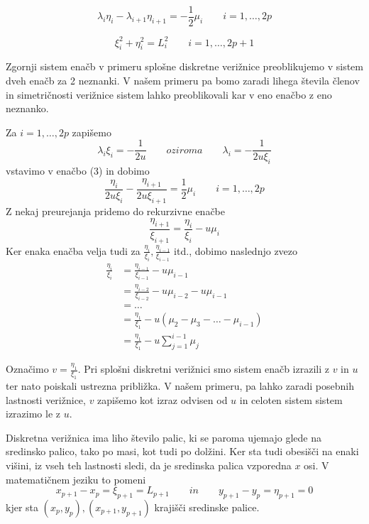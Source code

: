 \documentclass[A4paper, 11pt]{article}
\begin{document}
\begin{equation}
\lambda_i \eta_i - \lambda_{i+1} \eta_{i+1} = - \frac{1}{2} \mu_i \qquad i=1, \ldots, 2p 
\end{equation}

\begin{equation}
\xi_i ^2 + \eta_i ^2 = L_i ^2 \qquad i=1, \ldots, 2p+1 
\end{equation}

Zgornji sistem enačb v primeru splošne diskretne verižnice preoblikujemo v sistem dveh enačb za 2 neznanki. V našem primeru pa bomo zaradi lihega števila členov in simetričnosti verižnice sistem lahko preoblikovali kar v eno enačbo z eno neznanko. 

Za $i=1, \ldots, 2p$ zapišemo
\[ \lambda_i \xi_i = - \frac{1}{2u} \qquad oziroma \qquad \lambda_i = - \frac{1}{2u \xi_i}  \]
vstavimo v enačbo (3) in dobimo
\[ \frac{\eta_i}{2u \xi_i} - \frac{\eta_{i+1}}{2u \xi_{i+1}} = \frac{1}{2} \mu_i \qquad i=1, \ldots, 2p \]
Z nekaj preurejanja pridemo do rekurzivne enačbe
\[ \frac{\eta_{i+1}}{\xi_{i+1}} =  \frac{\eta_i}{\xi_i} - u \mu_i \]
Ker enaka enačba velja tudi za $\frac{\eta_i}{\xi_i}, \frac{\eta_{i-1}}{\xi_{i-1}}$ itd., dobimo naslednjo zvezo
\begin{equation}
\begin{split}
\frac{\eta_{i}}{\xi_{i}} & =  \frac{\eta_{i-1}}{\xi_{i-1}} - u \mu_{i-1}  \\
                                               & =  \frac{\eta_{i-2}}{\xi_{i-2}} - u \mu_{i-2} - u \mu_{i-1}  \\
                                               & = \ldots  \\
                                               & = \frac{\eta_1}{\xi_1} - u (\mu_2 - \mu_3 - \ldots - \mu_{i-1})  \\
                                               & = \frac{\eta_1}{\xi_1} - u \sum_{j=1}^{i-1} \mu_j
\end{split}
\end{equation}

Označimo $v = \frac{\eta_1}{\xi_1}$. Pri splošni diskretni verižnici smo sistem enačb izrazili z $v$ in $u$ ter nato poiskali ustrezna približka. V našem primeru, pa lahko zaradi posebnih lastnosti verižnice, $v$ zapišemo kot izraz odvisen od $u$ in celoten sistem sistem izrazimo le z $u$.

Diskretna verižnica ima liho število palic, ki se paroma ujemajo glede na sredinsko palico, tako po masi, kot tudi po dolžini. Ker sta tudi obesišči na enaki višini, iz vseh teh lastnosti sledi, da je sredinska palica vzporedna $x$ osi. V matematičnem jeziku to pomeni
\begin{equation}
x_{p+1} - x_p = \xi_{p+1} = L_{p+1} \qquad in \qquad y_{p+1} - y_p = \eta_{p+1} = 0
\end{equation}
kjer sta $(x_p,y_p), (x_{p+1}, y_{p+1})$ krajišči sredinske palice.
\end{document}
